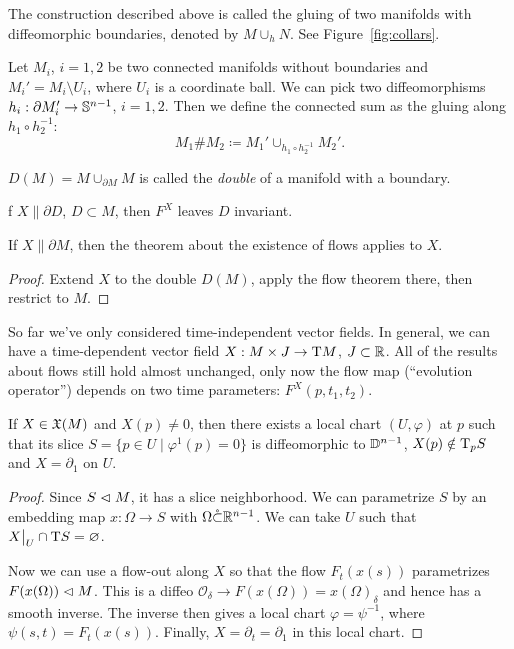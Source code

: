 \begin{defn}
    The construction described above is called the gluing of two manifolds with diffeomorphic boundaries, denoted by $M\cup_h N$. See Figure~\ref{fig:collars}.
\end{defn}

\begin{defn}
    Let $M_i$, $i=1,2$ be two connected manifolds without boundaries and $M_i'=M_i\setminus U_i$, where $U_i$ is a coordinate ball. We can pick two diffeomorphisms $h_i:\partial M_i'\to \mathbb{S}^{n-1}$, $i=1,2$. Then we define the connected sum as the gluing along $h_1\circ h_2^{-1}$:
    \[M_1 \# M_2\coloneqq M_1'\cup_{h_1\circ h_2^{-1}}M_2'.\]
\end{defn}
\begin{example}
    $D(M)=M\cup_{\partial M}M$ is called the \emph{double} of a manifold with a boundary.
\end{example}
\begin{example}
    f $X\parallel \partial D$, $D\subset M$, then $F^X$ leaves $D$ invariant.
\end{example}
\begin{cor}
    If $X\parallel \partial M$, then the theorem about the existence of flows applies to $X$.
\end{cor}
\begin{proof}
    Extend $X$ to the double $D(M)$, apply the flow theorem there, then restrict to $M$.
\end{proof}
\begin{example}
So far we've only considered time-independent vector fields. In general, we can have a time-dependent vector field $X:M\times J\to \mathrm{T} M$, $J\subset\mathbb{R} $. All of the results about flows still hold almost unchanged, only now the flow map (``evolution operator'') depends on two time parameters: $F^X(p,t_1,t_2)$.
\end{example}

\begin{thm}\label{rectification}
If $X\in\mathfrak{X}(M)$ and $X(p)\neq 0$, then there exists a local chart $(U,\varphi)$ at $p$ such that its slice $S=\{p\in U\mid \varphi^1(p)=0\}$ is diffeomorphic to $\mathbb{D}^{n-1}$, $X(p)\notin \mathrm{T}_p S$ and $X=\partial_1$ on $U$.
\end{thm}
\begin{proof}
Since $S\vartriangleleft M$, it has a slice neighborhood. We can parametrize $S$ by an embedding map $x:\Omega\to S$ with $\Omega\mathring{\subset}\mathbb{R}^{n-1}$. We can take $U$ such that $\restr{X}{U}\cap \T S=\varnothing$. 

Now we can use a flow-out along $X$ so that the flow $F_t(x(s))$ parametrizes $F(x(\Omega))\vartriangleleft M$. This is a diffeo $\mathcal{O}_\delta\to F(x(\Omega))=x(\Omega)_\delta$ and hence has a smooth inverse. The inverse then gives a local chart $\varphi=\psi^{-1}$, where $\psi(s,t)=F_t(x(s))$. Finally, $X=\partial_t=\partial_1$ in this local chart.
\end{proof}

